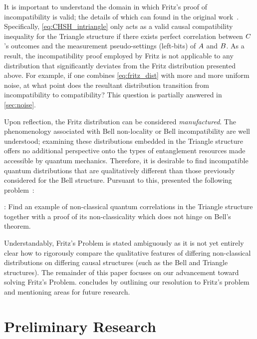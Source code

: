 \documentclass[aps, 10pt, english, twoside, pra, nofootinbib, tightenlines, longbibliography, superscriptaddress]{revtex4-1}
\begin{document}
    It is important to understand the domain in which Fritz's proof of incompatibility is valid; the details of which can found in the original work~\cite{Fritz_2012}. Specifically, \cref{eq:CHSH_intriangle} only acts as a valid causal compatibility inequality for the Triangle structure if there exists perfect correlation between $C$'s outcomes and the measurement pseudo-settings (left-bits) of $A$ and $B$. As a result, the incompatibility proof employed by Fritz is not applicable to any distribution that significantly deviates from the Fritz distribution presented above. For example, if one combines \cref{eq:fritz_dist} with more and more uniform noise, at what point does the resultant distribution transition from incompatibility to compatibility? This question is partially answered in \cref{sec:noise}.

    Upon reflection, the Fritz distribution can be considered \textit{manufactured}. The phenomenology associated with Bell non-locality or Bell incompatibility are well understood; examining these distributions embedded in the Triangle structure offers no additional perspective onto the types of entanglement resources made accessible by quantum mechanics. Therefore, it is desirable to find incompatible quantum distributions that are qualitatively different than those previously considered for the Bell structure. Pursuant to this, \citet{Fritz_2012} presented the following problem~\cite[Problem 2.17]{Fritz_2012}:%

    : Find an example of non-classical quantum correlations in the Triangle structure together with a proof of its non-classicality which does not hinge on Bell’s theorem.

    Understandably, Fritz's Problem is stated ambiguously as it is not yet entirely clear how to rigorously compare the qualitative features of differing non-classical distributions on differing causal structures (such as the Bell and Triangle structures). The remainder of this paper focuses on our advancement toward solving Fritz's Problem.  concludes by outlining our resolution to Fritz's problem and mentioning areas for future research.

    \section{Preliminary Research}
    \label{sec:preliminary_research}
\end{document}

